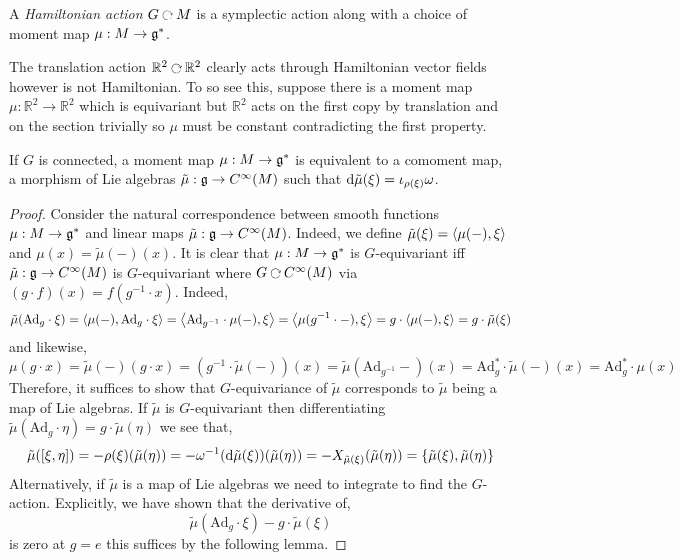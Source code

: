 \documentclass[12pt]{extarticle}
\newcommand{\R}{\mathbb{R}}
\newcommand{\Ad}{\mathrm{Ad}}
\begin{document}
\begin{defn}
A \textit{Hamiltonian action} $G \acts M$ is a symplectic action along with a choice of moment map $\mu : M \to \mathfrak{g}^*$.
\end{defn}

\begin{example}
The translation action $\R^2 \acts \R^2$ clearly acts through Hamiltonian vector fields however is not Hamiltonian. To so see this, suppose there is a moment map $\mu : \R^2 \to \R^2$ which is equivariant but $\R^2$ acts on the first copy by translation and on the section trivially so $\mu$ must be constant contradicting the first property. 
\end{example}

\begin{lemma}
If $G$ is connected, a moment map $\mu : M \to \mathfrak{g}^*$ is equivalent to a comoment map, a morphism of Lie algebras $\tilde{\mu} : \mathfrak{g} \to C^\infty(M)$ such that $\mathrm{d}{\tilde{\mu}(\xi)} = \iota_{\rho(\xi)} \omega$.
\end{lemma}

\begin{proof}
Consider the natural correspondence between smooth functions $\mu : M \to \mathfrak{g}^*$ and linear maps $\tilde{\mu} : \mathfrak{g} \to C^\infty(M)$. Indeed, we define $\tilde{\mu}(\xi) = \left< \mu(-) , \xi \right>$ and $\mu(x) = \tilde{\mu}(-)(x)$. It is clear that $\mu : M \to \mathfrak{g}^*$ is $G$-equivariant iff $\tilde{\mu} : \mathfrak{g} \to C^\infty(M)$ is $G$-equivariant where $G \acts C^\infty(M)$ via $(g \cdot f)(x) = f(g^{-1} \cdot x)$. Indeed,
\[ 
\tilde{\mu}(\Ad_g \cdot \xi) = \inner{\mu(-)}{\mathrm{Ad}_g \cdot \xi} = \inner{\Ad_{g^{-1}} \cdot \mu(-)}{\xi} = \inner{\mu(g^{-1} \cdot - )}{\xi} = g \cdot \inner{\mu(-)}{\xi} = g \cdot \tilde{\mu}(\xi) \]
and likewise,
\[ \mu(g \cdot x) = \tilde{\mu}(-)(g \cdot x) = (g^{-1} \cdot \tilde{\mu}(-))(x) = \tilde{\mu}(\mathrm{Ad}_{g^{-1}} -)(x) = \Ad_g^* \cdot \tilde{\mu}(-)(x) = \Ad_g^* \cdot \mu(x) \]
Therefore, it suffices to show that $G$-equivariance of $\tilde{\mu}$ corresponds to $\tilde{\mu}$ being a map of Lie algebras. If $\tilde{\mu}$ is $G$-equivariant then differentiating $\tilde{\mu}(\Ad_g \cdot \eta) = g \cdot \tilde{\mu}(\eta)$ we see that,
\[ \tilde{\mu}([\xi, \eta]) = -\rho(\xi) (\tilde{\mu}(\eta)) = -\omega^{-1}(\mathrm{d}{\tilde{\mu}(\xi)})(\tilde{\mu}(\eta)) = - X_{\tilde{\mu}(\xi)}(\tilde{\mu}(\eta)) = \{ \tilde{\mu}(\xi), \tilde{\mu}(\eta) \}  \]
Alternatively, if $\tilde{\mu}$ is a map of Lie algebras we need to integrate to find the $G$-action. Explicitly, we have shown that the derivative of,
\[ \tilde{\mu}(\Ad_g \cdot \xi) - g \cdot \tilde{\mu}(\xi) \]
is zero at $g = e$ this suffices by the following lemma.
\end{proof}
\end{document}
